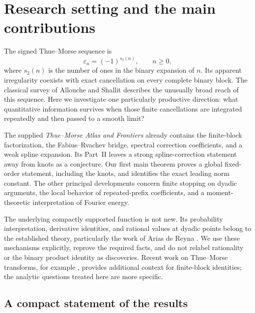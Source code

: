 \documentclass[11pt,a4paper]{article}
\numberwithin{equation}{section}
\theoremstyle{definition}
\newcommand{\eps}{\varepsilon}
\begin{document}
\begingroup
\small
\setlength{\parskip}{0pt}
\tableofcontents
\endgroup
\newpage

\section{Research setting and the main contributions}\label{sec:intro}

The signed Thue--Morse sequence is
\begin{equation}
 \eps_n=(-1)^{s_2(n)},\qquad n\geq0,
 \label{eq:epsilon}
\end{equation}
where $s_2(n)$ is the number of ones in the binary expansion of $n$.
Its apparent irregularity coexists with exact cancellation on every
complete binary block. The classical survey of Allouche and Shallit
\cite{allouche-shallit} describes the unusually broad reach of this
sequence. Here we investigate one particularly productive direction:
what quantitative information survives when those finite cancellations
are integrated repeatedly and then passed to a smooth limit?

The supplied \emph{Thue--Morse Atlas and Frontiers} \cite{atlas} already
contains the finite-block factorization, the Fabius--Rvachev bridge,
spectral correction coefficients, and a weak spline expansion. Its
Part~II leaves a strong spline-correction statement away from knots as a
conjecture. Our first main theorem proves a global fixed-order statement,
including the knots, and identifies the exact leading norm constant.
The other principal developments concern finite stopping on dyadic
arguments, the local behavior of repeated-prefix coefficients, and a
moment-theoretic interpretation of Fourier energy.

The underlying compactly supported function is not new. Its probability
interpretation, derivative identities, and rational values at dyadic
points belong to the established theory, particularly the work of Arias
de Reyna \cite{arias1982,arias2018}. We use these mechanisms explicitly,
reprove the required facts, and do not relabel rationality or the binary
product identity as discoveries. Recent work on Thue--Morse transforms,
for example \cite{cloitre}, provides additional context for finite-block
identities; the analytic questions treated here are more specific.

\subsection{A compact statement of the results}
\end{document}
